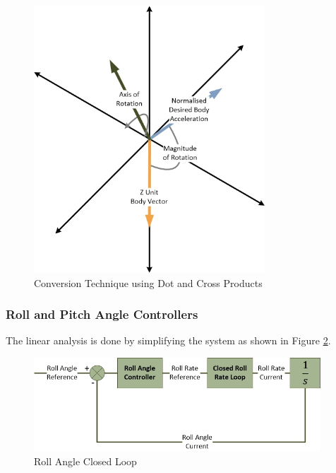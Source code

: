 		\begin{figure}[H]
			\centering
			\includegraphics[height = 10cm]{../References/Diagrams/ConversionMethod.jpg}
			\caption{Conversion Technique using Dot and Cross Products}
			\label{IM_AngleMethod}
		\end{figure}
	
		\subsubsection{Roll and Pitch Angle Controllers}
		The linear analysis is done by simplifying the system as shown in Figure \ref{IM_RollAngleLoop}.
		
		\begin{figure}[H]
			\centering
			\includegraphics[height = 3.5cm]{../References/Diagrams/RollAngleLoop.jpg}
			\caption{Roll Angle Closed Loop}
			\label{IM_RollAngleLoop}
		\end{figure}
		
